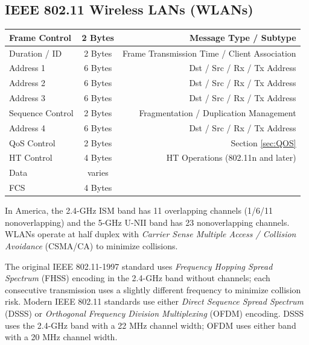 \documentclass[12pt]{article}
\begin{document}
	\subsection[IEEE 802.11 WLANs]{IEEE 802.11 Wireless LANs (WLANs) \label{subsec:802.11 WLANS}}
	\begin{table}[H]
	\centering
	\begin{tabular}{| l | c | r |}
	\hline
	Frame Control		& 2 Bytes	& Message Type / Subtype\\\hline
	Duration / ID		& 2 Bytes	& Frame Transmission Time / Client Association\\\hline
	Address 1			& 6 Bytes	& Dst / Src / Rx / Tx Address\\\hline
	Address 2			& 6 Bytes	& Dst / Src / Rx / Tx Address\\\hline
	Address 3			& 6 Bytes	& Dst / Src / Rx / Tx Address\\\hline
	Sequence Control		& 2 Bytes	& Fragmentation / Duplication Management\\\hline
	Address 4			& 6 Bytes	& Dst / Src / Rx / Tx Address\\\hline
	QoS Control		& 2 Bytes	& Section \ref{sec:QOS}\\\hline
	HT Control			& 4 Bytes	& HT Operations (802.11n and later)\\\hline
	Data				& varies	&\\\hline
	FCS				& 4 Bytes	&\\\hline
	\end{tabular}\end{table}
	In America, the 2.4-GHz ISM band has 11 overlapping channels (1/6/11 nonoverlapping) and the 5-GHz U-NII band has 23 nonoverlapping channels. WLANs operate at half duplex with \textit{Carrier Sense Multiple Access / Collision Avoidance} (CSMA/CA) to minimize collisions.
	
	The original IEEE 802.11-1997 standard uses \textit{Frequency Hopping Spread Spectrum} (FHSS) encoding in the 2.4-GHz band without channels; each consecutive transmission uses a slightly different frequency to minimize collision risk. Modern IEEE 802.11 standards use either \textit{Direct Sequence Spread Spectrum} (DSSS) or \textit{Orthogonal Frequency Division Multiplexing} (OFDM) encoding. DSSS uses the 2.4-GHz band with a 22 MHz channel width; OFDM uses either band with a 20 MHz channel width.
\end{document}
